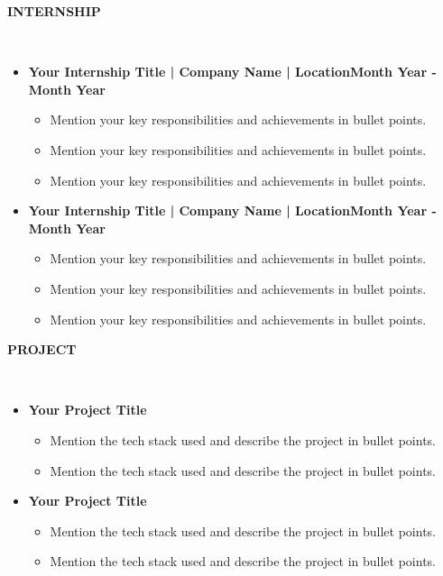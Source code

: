\documentclass[11pt,article]{article}
\newcommand{\resheading}[1]{{\small \colorbox{mygrey} { \begin{minipage}{0.99\textwidth}{\textbf{#1 \vphantom{p\^{E}}}}\end{minipage}}}}
\begin{document}
\noindent
\resheading{\textbf{INTERNSHIP} }\\[-0.35cm]
\vspace{-0.4em}
\begin{itemize}
\setlength\itemsep{-0.3em}
\item \textbf{Your Internship Title | Company Name | Location}\hfill \textbf{Month Year - Month Year} 
\vspace{-0.5em}
\begin{itemize}[noitemsep]
    \item Mention your key responsibilities and achievements in bullet points.
    \item Mention your key responsibilities and achievements in bullet points.
    \item Mention your key responsibilities and achievements in bullet points.
\end{itemize}
\item \textbf{Your Internship Title | Company Name | Location}\hfill \textbf{Month Year - Month Year} 
\vspace{-0.5em}
\begin{itemize}[noitemsep]
    \item Mention your key responsibilities and achievements in bullet points.
    \item Mention your key responsibilities and achievements in bullet points.
    \item Mention your key responsibilities and achievements in bullet points.
\end{itemize}
\end{itemize}

\noindent
\resheading{\textbf{PROJECT} }\\[-0.35cm]
\vspace{-0.4em}
\begin{itemize} [noitemsep]
\item \textbf{Your Project Title}
\vspace{-0.25em}
\begin{itemize} [noitemsep]
    \item Mention the tech stack used and describe the project in bullet points.
    \item Mention the tech stack used and describe the project in bullet points.
\end{itemize}
\item \textbf{Your Project Title}
\vspace{-0.25em}
\begin{itemize} [noitemsep]
    \item Mention the tech stack used and describe the project in bullet points.
    \item Mention the tech stack used and describe the project in bullet points.
\end{itemize}
\end{itemize}
\end{document}
